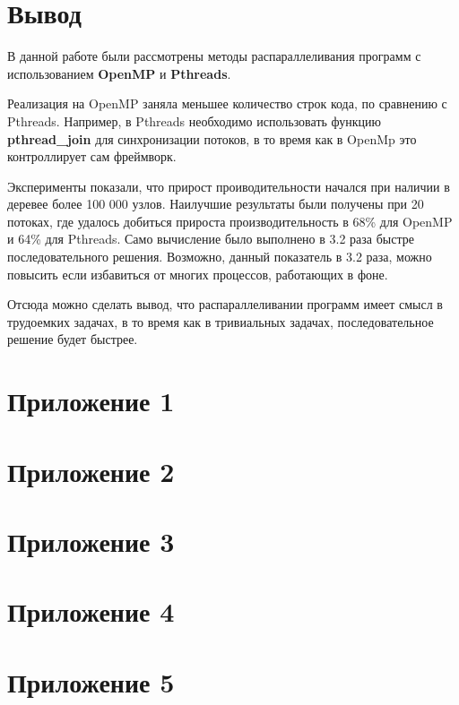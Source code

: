 \clearpage
{}
\section*{Вывод}
В данной работе были рассмотрены методы распараллеливания программ с использованием \textbf{OpenMP} и \textbf{Pthreads}.

Реализация на OpenMP заняла меньшее количество строк кода, по сравнению с Pthreads. Например, в Pthreads необходимо использовать функцию \textbf{pthread\_join} для синхронизации потоков, в то время как в OpenMp это контроллирует сам фреймворк.

Эксперименты показали, что прирост проиводительности начался при наличии в деревее более 100 000 узлов. Наилучшие результаты были получены при 20 потоках, где удалось добиться прироста производительность в 68\% для OpenMP и 64\% для Pthreads. Само вычисление было выполнено в 3.2 раза быстре последовательного решения. Возможно, данный показатель в 3.2 раза, можно повысить если избавиться от многих процессов, работающих в фоне.

Отсюда можно сделать вывод, что распараллеливании программ имеет смысл в трудоемких задачах, в то время как в тривиальных задачах, последовательное решение будет быстрее.



%
%


\clearpage
{}
\setcounter{section}{0}
\section*{Приложение 1} 

\section*{Приложение 2}

\section*{Приложение 3}

\section*{Приложение 4}

\section*{Приложение 5}






